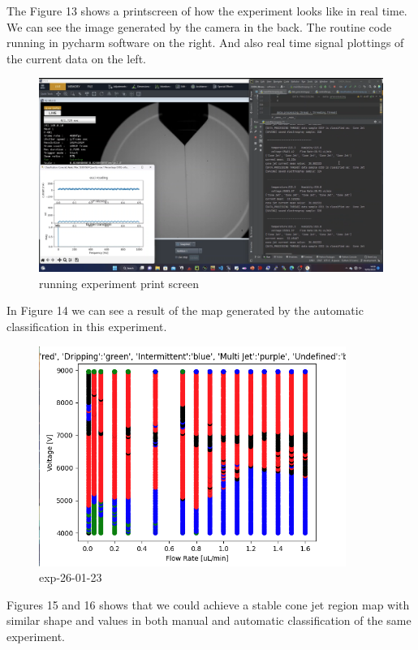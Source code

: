         The Figure 13 shows a printscreen of how the experiment looks like in real time.
        We can see the image generated by the camera in the back.
        The routine code running in pycharm software on the right.
        And also real time signal plottings of the current data on the left.

        \begin{figure}[H]
            \center
            \includegraphics[width=17cm]{Figuras/19:03/axs1.png}
            \caption{running experiment print screen}
        \end{figure}

        In Figure 14 we can see a result of the map generated by the automatic classification in this experiment.

        \begin{figure}[H]
            \center
            \includegraphics[width=10cm]{Figuras/report3/map-exp-26-01.png}
            \caption{ exp-26-01-23 }
        \end{figure}

        Figures 15 and 16 shows that we could achieve a stable cone jet region map with similar shape and values in both manual and automatic classification of the same experiment.

